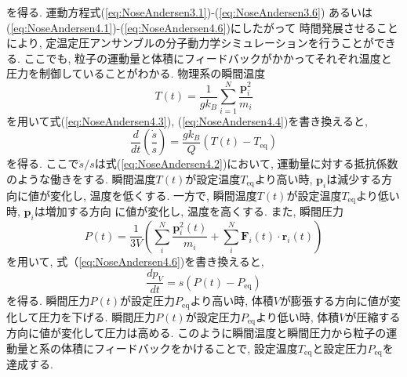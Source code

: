 を得る. 
運動方程式(\ref{eq:NoseAndersen3.1})-(\ref{eq:NoseAndersen3.6})
あるいは(\ref{eq:NoseAndersen4.1})-(\ref{eq:NoseAndersen4.6})にしたがって
時間発展させることにより, 定温定圧アンサンブルの分子動力学シミュレーションを行うことができる. 
ここでも, 粒子の運動量と体積にフィードバックがかかってそれぞれ温度と圧力を制御していることがわかる. 
物理系の瞬間温度
\begin{equation}
 T(t) = \frac{1}{g k_{B}} \sum_{i=1}^{N} \frac{\bm{p}_{i}^2}{m_{i}}
 \label{eq:NoseAndersen5}
\end{equation}
を用いて式(\ref{eq:NoseAndersen4.3}), (\ref{eq:NoseAndersen4.4})を書き換えると, 
\begin{equation}
 \frac{d}{d t} \left( \frac{\dot{s}}{s} \right)
  = \frac{g k_{B}}{Q} ( T(t) - T_{\mathrm{eq}})
 \label{eq:NoseAndersen6}
\end{equation}
を得る. 
ここで$\dot{s}/s$は式(\ref{eq:NoseAndersen4.2})において, 運動量に対する抵抗係数のような働きをする. 
瞬間温度$T(t)$が設定温度$T_{\mathrm{eq}}$より高い時, $\bm{p}_{i}$は減少する方向に値が変化し, 
温度を低くする. 
一方で, 瞬間温度$T(t)$が設定温度$T_{\mathrm{eq}}$より低い時, $\bm{p}_{i}$は増加する方向
に値が変化し, 温度を高くする. 
また, 瞬間圧力
\begin{equation}
 P(t)
  = \frac{1}{3V}
  \left(
   \sum_{i}^{N} \frac{\bm{p}_{i}^{2}(t)}{m_{i}}
 + \sum_{i}^{N} \bm{F}_{i}(t) \cdot \bm{r}_{i}(t)
  \right)
 \label{eq:NoseAndersen7}
\end{equation}
を用いて, 式（\ref{eq:NoseAndersen4.6})を書き換えると, 
\begin{equation}
 \frac{d p_{V}}{d t}
  = s \left(
       P(t) - P_{\mathrm{eq}}
      \right)
 \label{eq:NoseAndersen8}
\end{equation}
を得る. 
瞬間圧力$P(t)$が設定圧力$P_{\mathrm{eq}}$より高い時, 体積$V$が膨張する方向に値が変化して圧力を下げる. 
瞬間圧力$P(t)$が設定圧力$P_{\mathrm{eq}}$より低い時, 体積$V$が圧縮する方向に値が変化して圧力は高める. 
このように瞬間温度と瞬間圧力から粒子の運動量と系の体積にフィードバックをかけることで, 
設定温度$T_{\mathrm{eq}}$と設定圧力$P_{\mathrm{eq}}$を達成する. 

